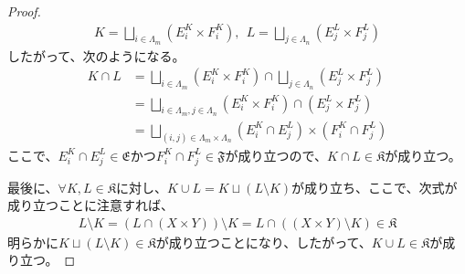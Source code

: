 \documentclass[dvipdfmx]{jsarticle}
\begin{document}
\begin{proof}
\begin{align*}
K = \bigsqcup_{i \in \varLambda_{m}} \left( E_{i}^{K} \times F_{i}^{K} \right),\ \ L = \bigsqcup_{j \in \varLambda_{n}} \left( E_{j}^{L} \times F_{j}^{L} \right)
\end{align*}
したがって、次のようになる。
\begin{align*}
K \cap L &= \bigsqcup_{i \in \varLambda_{m}} \left( E_{i}^{K} \times F_{i}^{K} \right) \cap \bigsqcup_{j \in \varLambda_{n}} \left( E_{j}^{L} \times F_{j}^{L} \right)\\
&= \bigsqcup_{i \in \varLambda_{m},j \in \varLambda_{n}} {\left( E_{i}^{K} \times F_{i}^{K} \right) \cap \left( E_{j}^{L} \times F_{j}^{L} \right)}\\
&= \bigsqcup_{(i,j) \in \varLambda_{m} \times \varLambda_{n}} {\left( E_{i}^{K} \cap E_{j}^{L} \right) \times \left( F_{i}^{K} \cap F_{j}^{L} \right)}
\end{align*}
ここで、$E_{i}^{K} \cap E_{j}^{L}\in \mathfrak{E}$かつ$F_{i}^{K} \cap F_{j}^{L}\in \mathfrak{F}$が成り立つので、$K \cap L \in \mathfrak{K}$が成り立つ。\par
最後に、$\forall K,L \in \mathfrak{K}$に対し、$K \cup L = K \sqcup (L \setminus K)$が成り立ち、ここで、次式が成り立つことに注意すれば、
\begin{align*}
L \setminus K = \left( L \cap (X \times Y) \right) \setminus K = L \cap \left( (X \times Y) \setminus K \right) \in \mathfrak{K}
\end{align*}
明らかに$K \sqcup (L \setminus K) \in \mathfrak{K}$が成り立つことになり、したがって、$K \cup L \in \mathfrak{K}$が成り立つ。
\end{proof}
\end{document}

